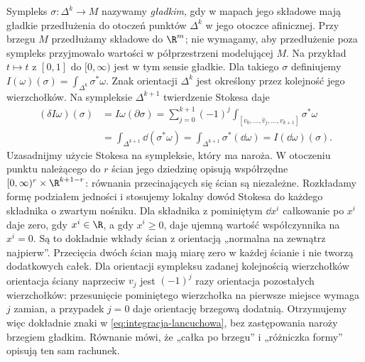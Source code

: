 Sympleks $\sigma:\Delta^k\to M$ nazywamy \emph{gładkim},
gdy w mapach jego składowe mają gładkie przedłużenia
do otoczeń punktów $\Delta^k$ w jego otoczce afinicznej.
Przy brzegu $M$ przedłużamy składowe do $\R^m$;
nie wymagamy, aby przedłużenie poza sympleks przyjmowało
wartości w półprzestrzeni modelującej $M$.
Na przykład $t\mapsto t$ z $[0,1]$ do $[0,\infty)$
jest w tym sensie gładkie. Dla takiego $\sigma$ definiujemy
$I(\omega)(\sigma)=\int_{\Delta^k}\sigma^*\omega$.
Znak orientacji $\Delta^k$ jest określony przez
kolejność jego wierzchołków. Na sympleksie
$\Delta^{k+1}$ twierdzenie Stokesa daje
\begin{equation}\label{eq:integracja-lancuchowa}
 \begin{aligned}
 (\delta I\omega)(\sigma)
 &= I\omega(\partial\sigma)
  =\sum_{j=0}^{k+1}(-1)^j
      \int_{[v_0,\ldots,\widehat v_j,\ldots,v_{k+1}]}
          \sigma^*\omega \\
 &=\int_{\Delta^{k+1}}\dd(\sigma^*\omega)
  =\int_{\Delta^{k+1}}\sigma^*(\dd\omega)
  =I(\dd\omega)(\sigma).
 \end{aligned}
\end{equation}
Uzasadnijmy użycie Stokesa na sympleksie, który ma naroża.
W otoczeniu punktu należącego do $r$ ścian jego dziedzinę
opisują współrzędne
$[0,\infty)^r\times\R^{k+1-r}$: równania przecinających
się ścian są niezależne. Rozkładamy formę podziałem
jedności i stosujemy lokalny dowód Stokesa do każdego
składnika o zwartym nośniku. Dla składnika z pominiętym
$\dd x^i$ całkowanie po $x^i$ daje zero, gdy $x^i\in\R$,
a gdy $x^i\geq0$, daje ujemną wartość współczynnika
na $x^i=0$. Są to dokładnie wkłady ścian z orientacją
„normalna na zewnątrz najpierw”. Przecięcia dwóch ścian
mają miarę zero w każdej ścianie i nie tworzą dodatkowych
całek. Dla orientacji sympleksu zadanej kolejnością
wierzchołków orientacja ściany naprzeciw $v_j$ jest
$(-1)^j$ razy orientacja pozostałych wierzchołków:
przesunięcie pominiętego wierzchołka na pierwsze miejsce
wymaga $j$ zamian, a przypadek $j=0$ daje orientację
brzegową dodatnią. Otrzymujemy więc dokładnie znaki
w \eqref{eq:integracja-lancuchowa}, bez zastępowania
naroży brzegiem gładkim.
Równanie mówi, że „całka po brzegu” i „różniczka
formy” opisują ten sam rachunek.

